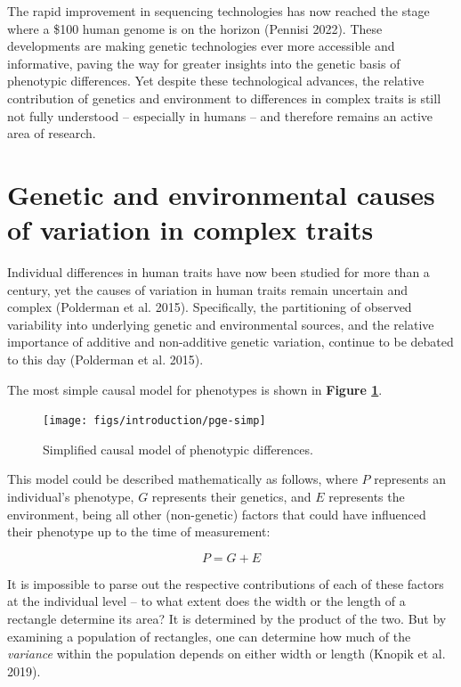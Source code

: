\documentclass[
]{book}
\begin{document}
The rapid improvement in sequencing technologies has now reached the stage where a \$100 human genome is on the horizon (Pennisi 2022). These developments are making genetic technologies ever more accessible and informative, paving the way for greater insights into the genetic basis of phenotypic differences. Yet despite these technological advances, the relative contribution of genetics and environment to differences in complex traits is still not fully understood -- especially in humans -- and therefore remains an active area of research.

\hypertarget{genetic-and-environmental-causes-of-variation-in-complex-traits}{%
\section{Genetic and environmental causes of variation in complex traits}\label{genetic-and-environmental-causes-of-variation-in-complex-traits}}

Individual differences in human traits have now been studied for more than a century, yet the causes of variation in human traits remain uncertain and complex (Polderman et al. 2015). Specifically, the partitioning of observed variability into underlying genetic and environmental sources, and the relative importance of additive and non-additive genetic variation, continue to be debated to this day (Polderman et al. 2015).

The most simple causal model for phenotypes is shown in \textbf{Figure \ref{fig:pge-simp}}.



\begin{figure}

{\centering \texttt{[image: figs/introduction/pge-simp]} 

}

\caption{Simplified causal model of phenotypic differences.}\label{fig:pge-simp}
\end{figure}

This model could be described mathematically as follows, where \(P\) represents an individual's phenotype, \(G\) represents their genetics, and \(E\) represents the environment, being all other (non-genetic) factors that could have influenced their phenotype up to the time of measurement:

\begin{equation}
P = G + E \label{eq:pge-simp}
\end{equation}

It is impossible to parse out the respective contributions of each of these factors at the individual level -- to what extent does the width or the length of a rectangle determine its area? It is determined by the product of the two. But by examining a population of rectangles, one can determine how much of the \emph{variance} within the population depends on either width or length (Knopik et al. 2019).
\end{document}
